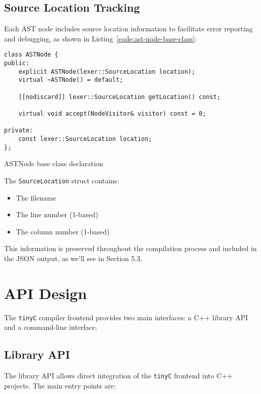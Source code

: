 \subsection{Source Location Tracking}

Each AST node includes source location information to facilitate error reporting and debugging, as shown in Listing~\ref{code:ast-node-base-class}:

\begin{listing}[ht!]
\begin{verbatim}
class ASTNode {
public:
    explicit ASTNode(lexer::SourceLocation location);
    virtual ~ASTNode() = default;
    
    [[nodiscard]] lexer::SourceLocation getLocation() const;
    
    virtual void accept(NodeVisitor& visitor) const = 0;

private:
    const lexer::SourceLocation location;
};
\end{verbatim}
\caption{ASTNode base class declaration}
\label{code:ast-node-base-class}
\end{listing}

The \texttt{SourceLocation} struct contains:
\begin{itemize}
    \item The filename
    \item The line number (1-based)
    \item The column number (1-based)
\end{itemize}

This information is preserved throughout the compilation process and included in the JSON output, as we'll see in Section 5.3.

\section{API Design}

The \texttt{tinyC} compiler frontend provides two main interfaces: a C++ library API and a command-line interface.

\subsection{Library API}

The library API allows direct integration of the \texttt{tinyC} frontend into C++ projects. The main entry points are:


